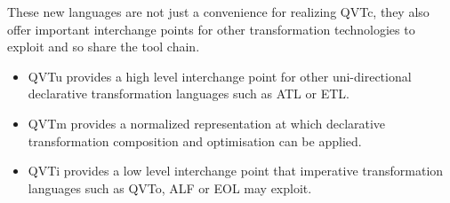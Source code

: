 These new languages are not just a convenience for realizing QVTc, they also offer important interchange points for other transformation technologies to exploit and so share the tool chain.

\begin{itemize}
\item QVTu provides a high level interchange point for other uni-directional declarative transformation languages such as ATL or ETL.
\item QVTm provides a normalized representation at which declarative transformation composition and optimisation can be applied.
\item QVTi provides a low level interchange point that imperative transformation languages such as QVTo, ALF or EOL may exploit.
\end{itemize}




